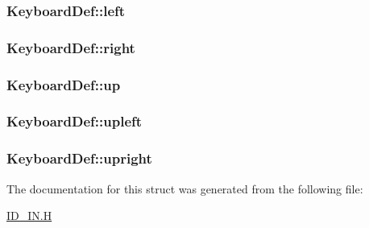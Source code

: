 \label{structKeyboardDef_a930c406144180a835ab921754fc36554}
\hypertarget{structKeyboardDef_a9a0a0d613d9f1320ea3b59a63e51ed54}{
\subsubsection[{left}]{ {\bf KeyboardDef::left}}}
\label{structKeyboardDef_a9a0a0d613d9f1320ea3b59a63e51ed54}
\hypertarget{structKeyboardDef_abdc1b4575cee3d0e0ade5111d5acfcbe}{
\subsubsection[{right}]{ {\bf KeyboardDef::right}}}
\label{structKeyboardDef_abdc1b4575cee3d0e0ade5111d5acfcbe}
\hypertarget{structKeyboardDef_a686d251fafc9949ceff912a8e3de3b21}{
\subsubsection[{up}]{ {\bf KeyboardDef::up}}}
\label{structKeyboardDef_a686d251fafc9949ceff912a8e3de3b21}
\hypertarget{structKeyboardDef_af7fa54d606cad8d67a8bc63d34223e6d}{
\subsubsection[{upleft}]{ {\bf KeyboardDef::upleft}}}
\label{structKeyboardDef_af7fa54d606cad8d67a8bc63d34223e6d}
\hypertarget{structKeyboardDef_a0b92318bb08cc930a068e54aac4612fa}{
\subsubsection[{upright}]{ {\bf KeyboardDef::upright}}}
\label{structKeyboardDef_a0b92318bb08cc930a068e54aac4612fa}


The documentation for this struct was generated from the following file:\begin{DoxyCompactItemize}
\item 
\hyperlink{ID__IN_8H}{ID\_\-IN.H}\end{DoxyCompactItemize}
